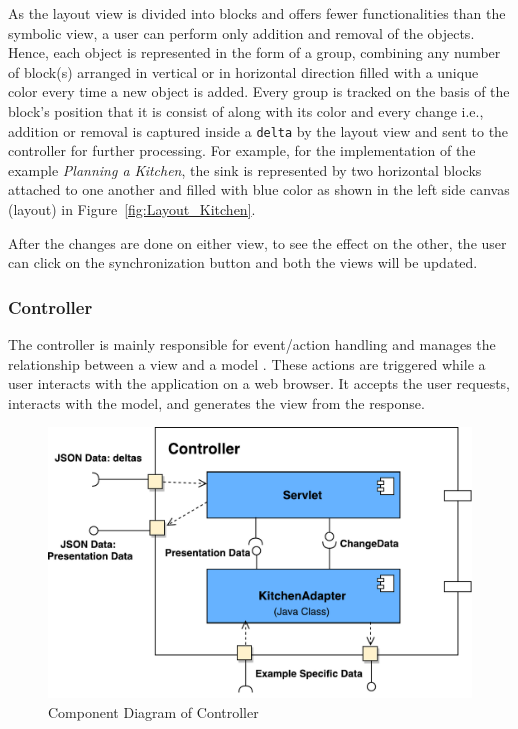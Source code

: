 As the layout view is divided into blocks and offers fewer functionalities than the symbolic view, a user can perform only addition and removal of the objects. Hence, each object is represented in the form of a group, combining any number of block(s) arranged in vertical or in horizontal direction filled with a unique color every time a new object is added. Every group is tracked on the basis of the block's position that it is consist of along with its color and every change i.e., addition or removal is captured inside a \texttt{delta} by the layout view and sent to the controller for further processing. For example, for the implementation of the example \textit{Planning a Kitchen}, the sink is represented by two horizontal blocks attached to one another and filled with {\color{blue} blue} color as shown in the left side canvas (layout) in Figure~\ref{fig:Layout_Kitchen}. 

After the changes are done on either view, to see the effect on the other, the user can click on the synchronization button and both the views will be updated.
 
\subsubsection{Controller}\label{subsubsec:design_controller}
The controller is mainly responsible for event/action handling and manages the relationship between a view and a model \cite{mdd-webwithmvc}. These actions are triggered while a user interacts with the application on a web browser. It accepts the user requests, interacts with the model, and generates the view from the response.

\begin{figure}[h]
	\includegraphics[width=1\textwidth]{figures/Component_Diagram-Controller}
	\caption{Component Diagram of Controller}
	\label{fig:Component_Diagram-Controller}
\end{figure}

